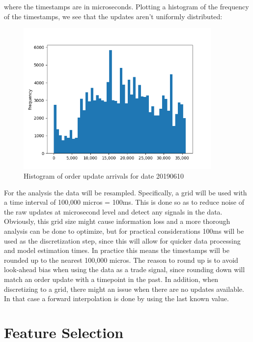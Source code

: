 \documentclass[english, 11pt, a4paper]{article}
\begin{document}
where the timestamps are in microseconds. Plotting a histogram of the frequency of the timestamps,
we see that the updates aren't uniformly distributed: 

 \begin{figure}[H] 
	\centering
	\includegraphics[width=0.90\textwidth]{../data/figures/hist_20190610_timestamps.png}
	\caption{Histogram of order update arrivals for date 20190610}
	\label{fig1}
\end{figure}

For the analysis the data will be resampled. Specifically, a grid will be used with a time interval of
100,000 micros = 100ms. This is done so as to reduce noise of the raw updates at microsecond level and detect any
signals in the data. Obviously, this grid size might cause information loss and a more thorough
analysis can be done to optimize, but for practical considerations 100ms will be used as the
discretization step, since this will allow for quicker data processing and model estimation times. 
In practice this means the timestamps will be rounded up to the nearest 100,000 micros.
The reason to round up is to avoid look-ahead bias when using the data as a trade signal, since
rounding down will match an order update with a timepoint in the past. In addition, when
discretizing to a grid, there might an issue when there are no updates available. In that case a
forward interpolation is done by using the last known value.

\section{Feature Selection}
\end{document}

